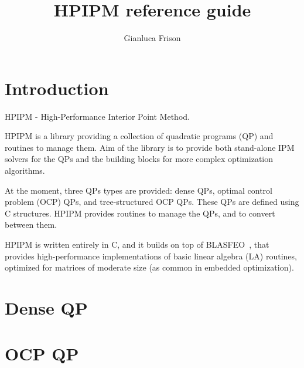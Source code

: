 \documentclass[a4paper]{report}
\title{HPIPM reference guide}
\author{Gianluca Frison}
\begin{document}
\maketitle
\tableofcontents





\chapter{Introduction}

HPIPM - High-Performance Interior Point Method.

HPIPM is a library providing a collection of quadratic programs (QP) and routines to manage them.
Aim of the library is to provide both stand-alone IPM solvers for the QPs and the building blocks for more complex optimization algorithms.

At the moment, three QPs types are provided: dense QPs, optimal control problem (OCP) QPs, and tree-structured OCP QPs.
These QPs are defined using C structures.
HPIPM provides routines to manage the QPs, and to convert between them.

HPIPM is written entirely in C, and it builds on top of BLASFEO~\cite{BLASFEO}, that provides high-performance implementations of basic linear algebra (LA) routines, optimized for matrices of moderate size (as common in embedded optimization).



\chapter{Dense QP}



\chapter{OCP QP}
\end{document}
